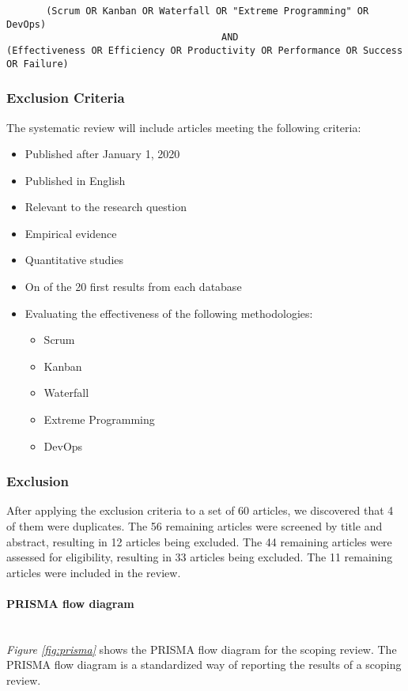 \documentclass[12pt]{article}
\newcommand{\subsubsubsection}[1]{\paragraph{#1}\mbox{}\\}
\begin{document}
\begin{adjustwidth}{-4em}{0pt}
\begin{verbatim}
       (Scrum OR Kanban OR Waterfall OR "Extreme Programming" OR DevOps) 
                                      AND
(Effectiveness OR Efficiency OR Productivity OR Performance OR Success OR Failure)
\end{verbatim}
\end{adjustwidth}

\subsubsection{Exclusion Criteria}
The systematic review will include articles meeting the following criteria:
\begin{itemize}
  \item Published after January 1, 2020
  \item Published in English
  \item Relevant to the research question
  \item Empirical evidence
  \item Quantitative studies
  \item On of the 20 first results from each database
  \item Evaluating the effectiveness of the following methodologies:
  \begin{itemize}
    \item Scrum
    \item Kanban
    \item Waterfall
    \item Extreme Programming
    \item DevOps
  \end{itemize}
\end{itemize}

\subsubsection{Exclusion}
After applying the exclusion criteria to a set of 60 articles, we discovered that 4 of them were duplicates.
The 56 remaining articles were screened by title and abstract, resulting in 12 articles being excluded.
The 44 remaining articles were assessed for eligibility, resulting in 33 articles being excluded.
The 11 remaining articles were included in the review.

\subsubsubsection{PRISMA flow diagram}
\textit{Figure \ref{fig:prisma}} shows the PRISMA \cite{PRISMAStatement} flow diagram for the scoping review.
The PRISMA flow diagram is a standardized way of reporting the results of a scoping review.
\end{document}
